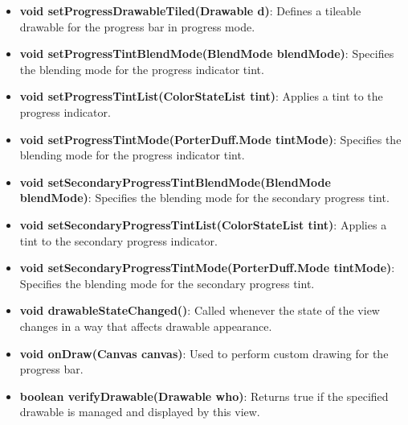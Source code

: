 \documentclass{report}
\begin{document}
\begin{itemize}
\begin{itemize}
        \item \textbf{void setProgressDrawableTiled(Drawable d)}: Defines a tileable drawable for the progress bar in progress mode.
        \item \textbf{void setProgressTintBlendMode(BlendMode blendMode)}: Specifies the blending mode for the progress indicator tint.
        \item \textbf{void setProgressTintList(ColorStateList tint)}: Applies a tint to the progress indicator.
        \item \textbf{void setProgressTintMode(PorterDuff.Mode tintMode)}: Specifies the blending mode for the progress indicator tint.
        \item \textbf{void setSecondaryProgressTintBlendMode(BlendMode blendMode)}: Specifies the blending mode for the secondary progress tint.
        \item \textbf{void setSecondaryProgressTintList(ColorStateList tint)}: Applies a tint to the secondary progress indicator.
        \item \textbf{void setSecondaryProgressTintMode(PorterDuff.Mode tintMode)}: Specifies the blending mode for the secondary progress tint.
        \item \textbf{void drawableStateChanged()}: Called whenever the state of the view changes in a way that affects drawable appearance.
        \item \textbf{void onDraw(Canvas canvas)}: Used to perform custom drawing for the progress bar.
        \item \textbf{boolean verifyDrawable(Drawable who)}: Returns true if the specified drawable is managed and displayed by this view.
    \end{itemize}

    \pagebreak 

\end{itemize}
\end{document}
